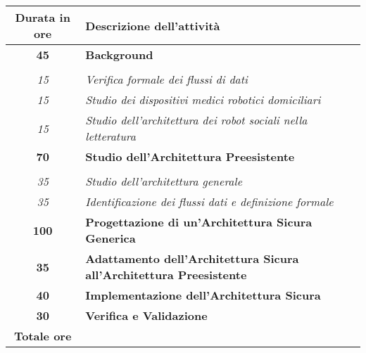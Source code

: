 

\begin{tabularx}{\textwidth}{|c|X|}
	\hline
	\textbf{Durata in ore} & \textbf{Descrizione dell'attività} \\\hline
	
	\textbf{45} & \textbf{Background} \\
    \hdashline
    \multirow{3}{0cm}\\
    \textit{15} & \textit{Verifica formale dei flussi di dati} \\
    \textit{15} & \textit{Studio dei dispositivi medici robotici domiciliari} \\
    \textit{15} & \textit{Studio dell'architettura dei robot sociali nella letteratura}\\	 
    \hline
    
    \textbf{70} & \textbf{Studio dell'Architettura Preesistente} \\ \hdashline 
    \multirow{2}{0cm}\\ 
    \textit{35} & 
    \textit{Studio dell'architettura generale} \\
    \textit{35} & 
    \textit{Identificazione dei flussi dati e definizione formale} \\
    \hline
    
    \textbf{100} & \textbf{Progettazione di un'Architettura Sicura Generica}  \\  
    \hline

    \textbf{35} & \textbf{Adattamento dell'Architettura Sicura all'Architettura Preesistente}  \\  
    \hline

    \textbf{40} & \textbf{Implementazione dell'Architettura Sicura}  \\  
    \hline

    \textbf{30} & \textbf{Verifica e Validazione}  \\  
    \hline
	
	\textbf{Totale ore} & \multicolumn{1}{|c|}{\textbf{\totaleOre}} \\\hline
	
	
\end{tabularx}
